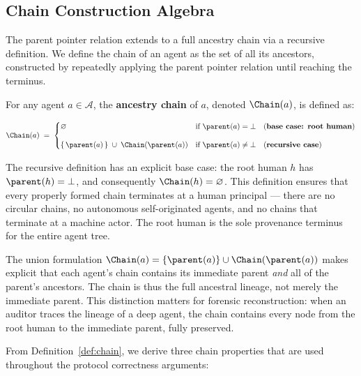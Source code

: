 \subsection{Chain Construction Algebra}
\label{sec:chain-construction}

The parent pointer relation extends to a full ancestry chain via a recursive definition. We define the chain of an agent as the set of all its ancestors, constructed by repeatedly applying the parent pointer relation until reaching the terminus.

\begin{definition}
\label{def:chain}
For any agent $a \in \mathcal{A}$, the \textbf{ancestry chain} of $a$, denoted $\Chain(a)$, is defined as:

\begin{equation}
\Chain(a) \;=\;
\begin{cases}
\varnothing & \text{if } \parent(a) = \bot \quad \text{(\textbf{base case: root human})} \\[10pt]
\{\,\parent(a)\,\} \;\cup\; \Chain(\parent(a)) & \text{if } \parent(a) \neq \bot \quad \text{(\textbf{recursive case})}
\end{cases}
\end{equation}
\end{definition}

The recursive definition has an explicit base case: the root human $h$ has $\parent(h) = \bot$, and consequently $\Chain(h) = \varnothing$. This definition ensures that every properly formed chain terminates at a human principal — there are no circular chains, no autonomous self-originated agents, and no chains that terminate at a machine actor. The root human is the sole provenance terminus for the entire agent tree.

The union formulation $\Chain(a) = \{\parent(a)\} \cup \Chain(\parent(a))$ makes explicit that each agent's chain contains its immediate parent \emph{and} all of the parent's ancestors. The chain is thus the full ancestral lineage, not merely the immediate parent. This distinction matters for forensic reconstruction: when an auditor traces the lineage of a deep agent, the chain contains every node from the root human to the immediate parent, fully preserved.

From Definition~\ref{def:chain}, we derive three chain properties that are used throughout the protocol correctness arguments:

